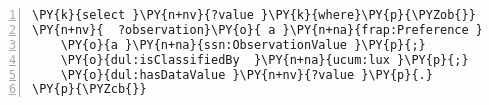 \expandafter\def\csname PY@tok@err\endcsname{}
{\small
\begin{Verbatim}[commandchars=\\\{\},numbers=left,firstnumber=1,stepnumber=1]
\PY{k}{select }\PY{n+nv}{?value }\PY{k}{where}\PY{p}{\PYZob{}}
\PY{n+nv}{  ?observation}\PY{o}{ a }\PY{n+na}{frap:Preference }\PY{p}{;}
	\PY{o}{a }\PY{n+na}{ssn:ObservationValue }\PY{p}{;}
	\PY{o}{dul:isClassifiedBy  }\PY{n+na}{ucum:lux }\PY{p}{;}
	\PY{o}{dul:hasDataValue }\PY{n+nv}{?value }\PY{p}{.}
\PY{p}{\PYZcb{}}
\end{Verbatim}
}
